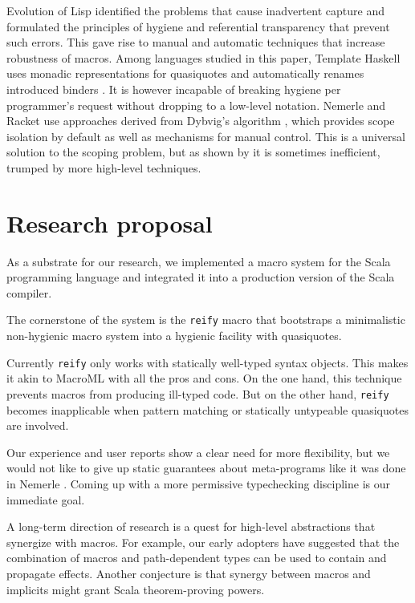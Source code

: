 \documentclass[10pt,journal,a4paper]{IEEEtran}
\begin{document}
Evolution of Lisp identified the problems that cause
inadvertent capture and formulated the principles of hygiene and referential transparency
that prevent such errors. This gave rise to manual \cite{clinger91a,hoyte08}
and automatic \cite{kohlbecker86, dybvig92} techniques that increase robustness of macros.
Among languages studied in this paper, Template Haskell uses monadic representations
for quasiquotes and automatically renames introduced binders \cite{sheard02}. It is
however incapable of breaking hygiene per programmer's request without dropping
to a low-level notation. Nemerle \cite{skalski04} and Racket \cite{barzilay11}
use approaches derived from Dybvig's algorithm \cite{dybvig92}, which provides scope isolation by default
as well as mechanisms for manual control. This is a universal solution to the scoping problem,
but as shown by \cite{barzilay11} it is sometimes inefficient, trumped by more high-level techniques.

\section{Research proposal}

As a substrate for our research, we implemented a macro system \cite{burmako12}
for the Scala programming language \cite{odersky10}
and integrated it into a production version of the Scala compiler.

The cornerstone of the system is the \small \texttt{reify} \normalsize macro that bootstraps
a minimalistic non-hygienic macro system into a hygienic facility with quasiquotes.

Currently \small \texttt{reify} \normalsize only works with statically well-typed syntax objects.
This makes it akin to MacroML \cite{ganz01} with all the pros and cons. On the one hand, this
technique prevents macros from producing ill-typed code. But on the other hand,
\small \texttt{reify} \normalsize becomes inapplicable when pattern matching or statically untypeable
quasiquotes are involved.

Our experience and user reports show a clear need for more flexibility, but we would not like to give up
static guarantees about meta-programs like it was done in Nemerle \cite{skalski04}. Coming up with a more
permissive typechecking discipline is our immediate goal.

A long-term direction of research is a quest for high-level abstractions that synergize with macros.
For example, our early adopters have suggested that the combination of macros
and path-dependent types can be used to contain and propagate effects. Another conjecture is that
synergy between macros and implicits might grant Scala theorem-proving powers.
\end{document}
